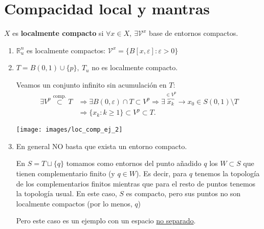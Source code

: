 
\section{Compacidad local y mantras}%
\label{sec:compacidad_local_y_mantras}
\begin{defi}
$X$ es \textbf{localmente compacto} si $\forall x \in X,\ \exists \mathcal{V}^x$ base de entornos compactos.
\end{defi}

\begin{ej}
\begin{enumerate}
    \item $\mathbb{R}_u^n$ es localmente compactos: $\mathcal{V}^x = \{B\left[ x, \varepsilon \right] : \varepsilon > 0\}$

    \item $T = B\left( 0, 1 \right) \cup \{p\},\ T_u$ no es localmente compacto.
    \begin{demo}
    Veamos un conjunto infinito sin acumulación en $T$:
    \begin{align*}
        \exists V^p \stackrel{\text{comp.}}{\subset} T &\Rightarrow \exists B\left( 0, \varepsilon \right) \cap T \subset V^p \Rightarrow \exists \overbrace{x_k}^{\in V^p} \rightarrow x_0 \in S\left( 0, 1 \right) \setminus T\\
       &\Rightarrow \{x_k : k \ge 1\} \subset V^p \subset T 
    .\end{align*}
    \end{demo}
    \begin{center}
        \texttt{[image: images/loc\_comp\_ej\_2]} 
    \end{center}

    \item En general NO basta que exista un entorno compacto.

    En $S = T \sqcup \{q\}$ tomamos como entornos del punto añadido $q$ los $W \subset S$ que tienen complementario finito (y $q \in W$). 
    Es decir, para $q$ tenemos la topología de los complementarios finitos mientras que para el resto de puntos tenemos la topología usual.
    En este caso, $S$ es compacto, pero sus puntos no son localmente compactos (por lo menos, $q$)

    Pero este caso es un ejemplo con un espacio \underline{no separado}.
\end{enumerate}
\end{ej}

